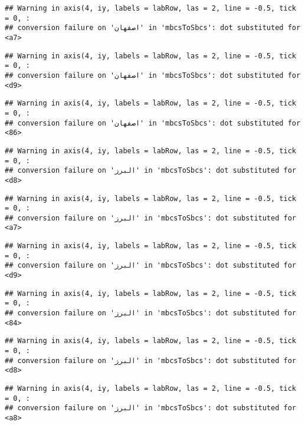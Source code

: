 \documentclass[
]{article}
\begin{document}
\begin{verbatim}
## Warning in axis(4, iy, labels = labRow, las = 2, line = -0.5, tick = 0, :
## conversion failure on 'اصفهان' in 'mbcsToSbcs': dot substituted for <a7>
\end{verbatim}

\begin{verbatim}
## Warning in axis(4, iy, labels = labRow, las = 2, line = -0.5, tick = 0, :
## conversion failure on 'اصفهان' in 'mbcsToSbcs': dot substituted for <d9>
\end{verbatim}

\begin{verbatim}
## Warning in axis(4, iy, labels = labRow, las = 2, line = -0.5, tick = 0, :
## conversion failure on 'اصفهان' in 'mbcsToSbcs': dot substituted for <86>
\end{verbatim}

\begin{verbatim}
## Warning in axis(4, iy, labels = labRow, las = 2, line = -0.5, tick = 0, :
## conversion failure on 'البرز' in 'mbcsToSbcs': dot substituted for <d8>
\end{verbatim}

\begin{verbatim}
## Warning in axis(4, iy, labels = labRow, las = 2, line = -0.5, tick = 0, :
## conversion failure on 'البرز' in 'mbcsToSbcs': dot substituted for <a7>
\end{verbatim}

\begin{verbatim}
## Warning in axis(4, iy, labels = labRow, las = 2, line = -0.5, tick = 0, :
## conversion failure on 'البرز' in 'mbcsToSbcs': dot substituted for <d9>
\end{verbatim}

\begin{verbatim}
## Warning in axis(4, iy, labels = labRow, las = 2, line = -0.5, tick = 0, :
## conversion failure on 'البرز' in 'mbcsToSbcs': dot substituted for <84>
\end{verbatim}

\begin{verbatim}
## Warning in axis(4, iy, labels = labRow, las = 2, line = -0.5, tick = 0, :
## conversion failure on 'البرز' in 'mbcsToSbcs': dot substituted for <d8>
\end{verbatim}

\begin{verbatim}
## Warning in axis(4, iy, labels = labRow, las = 2, line = -0.5, tick = 0, :
## conversion failure on 'البرز' in 'mbcsToSbcs': dot substituted for <a8>
\end{verbatim}
\end{document}
